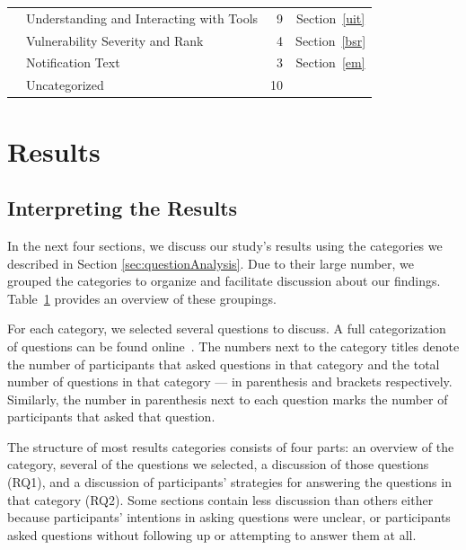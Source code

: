 \documentclass[10pt,journal,compsoc]{IEEEtran}
\begin{document}
\begin{table}
\begin{tabularx}{\textwidth}{|l|X|r|c|}
		
		
		& Understanding and Interacting with Tools						& 9     		& Section~\ref{uit}			\\
		
		& Vulnerability Severity and Rank								& 4     		& Section~\ref{bsr}		\\
		
		& Notification Text												& 3     		& Section~\ref{em}		\\
		
		\hline	
		& Uncategorized													& 10    		&			 \\
		\hline
	\end{tabularx}
	\label{table:categories}
\end{table}



\section{Results}
\label{sec:results}
\subsection{Interpreting the Results}

In the next four sections, we discuss our study's results using the categories we described in Section \ref{sec:questionAnalysis}.
Due to their large number, we grouped the categories to organize and facilitate discussion about our findings. 
Table~\ref{table:categories} provides an overview of these groupings.

For each category, we selected several questions to discuss. A full categorization of questions can be found online~\cite{ExperimentalMaterials}.
The numbers next to the category titles denote the number of participants that asked questions in that category and the total number of questions in that category --- in parenthesis and brackets respectively. Similarly, the number in parenthesis next to each question marks the number of participants that asked that question.

The structure of most results categories consists of four parts: an overview of the category, several of the questions we selected, a discussion of those questions (RQ1), and a discussion of participants' strategies for answering the questions in that category (RQ2).
Some sections contain less discussion than others either because participants' intentions in asking questions were unclear, or participants asked questions without following up or attempting to answer them at all. 
\end{document}
